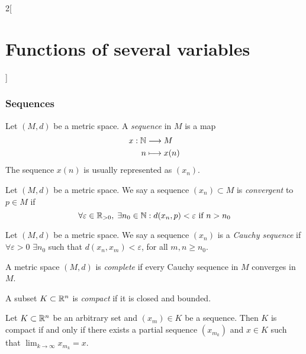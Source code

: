 \documentclass[../../../main.tex]{subfiles}
\begin{document}
\begin{multicols}{2}[\section{Functions of several variables}]
  \subsubsection{Sequences}
  \begin{definition}
    Let $(M,d)$ be a metric space. A \textit{sequence} in $M$ is a map
    \begin{align*}
      x:\mathbb{N} & \longrightarrow M \\
      n     & \longmapsto x(n)
    \end{align*}
    The sequence $x(n)$ is usually represented as $(x_n)$.
  \end{definition}
  \begin{definition}
    Let $(M,d)$ be a metric space. We say a sequence $(x_n)\subset M$ is \textit{convergent} to $p\in M$ if $$\forall\varepsilon\in\mathbb{R}_{>0},\;\exists n_0\in\mathbb{N} :d(x_n,p)<\varepsilon\text{ if }n>n_0$$
  \end{definition}
  \begin{definition}
    Let $(M,d)$ be a metric space. We say a sequence $(x_n)$ is a \textit{Cauchy sequence} if $\forall\varepsilon>0$ $\exists n_0$ such that $d(x_n,x_m)<\varepsilon$, for all $m,n\geq n_0$.
  \end{definition}
  \begin{definition}
    A metric space $(M,d)$ is \textit{complete} if every Cauchy sequence in $M$ converges in $M$.
    \label{FOSV_complete}
  \end{definition}
  \begin{definition}
    A subset $K\subset\mathbb{R}^n$ is \textit{compact} if it is closed and bounded.
  \end{definition}
  \begin{theorem}
    Let $K\subset\mathbb{R}^n$ be an arbitrary set and $(x_m)\in K$ be a sequence. Then $K$ is compact if and only if there exists a partial sequence $(x_{m_k})$ and $x\in K$ such that $\displaystyle\lim_{k\to\infty}x_{m_k}=x$.
  \end{theorem}

\end{multicols}
\end{document}
